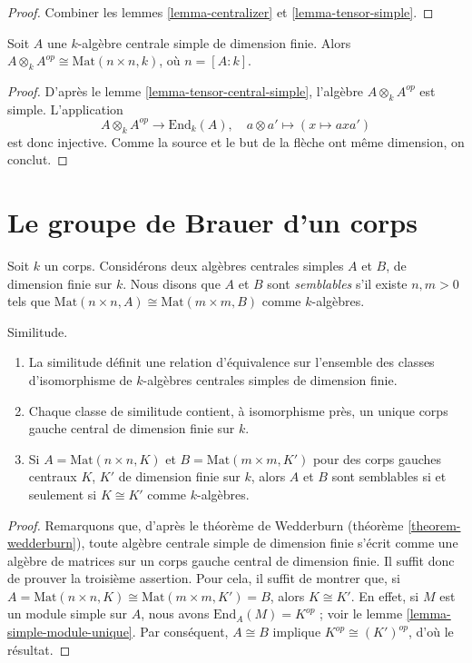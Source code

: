 \begin{proof}
Combiner les lemmes \ref{lemma-centralizer} et \ref{lemma-tensor-simple}.
\end{proof}

\begin{lemma}
\label{lemma-inverse}
Soit $A$ une $k$-algèbre centrale simple de dimension finie.
Alors $A \otimes_k A^{op} \cong \text{Mat}(n \times n, k)$,
où $n = [A : k]$.
\end{lemma}

\begin{proof}
D'après le lemme \ref{lemma-tensor-central-simple}, l'algèbre
$A \otimes_k A^{op}$ est simple. L'application
$$
A \otimes_k A^{op} \longrightarrow \text{End}_k(A),\quad
a \otimes a' \longmapsto (x \mapsto axa')
$$
est donc injective. Comme la source et le but de la flèche ont même dimension,
on conclut.
\end{proof}





\section{Le groupe de Brauer d'un corps}
\label{section-brauer}

\noindent
Soit $k$ un corps. Considérons deux algèbres centrales simples $A$ et $B$,
de dimension finie sur $k$. Nous disons que $A$ et $B$ sont {\it semblables}
s'il existe $n, m > 0$ tels que
$\text{Mat}(n \times n, A) \cong \text{Mat}(m \times m, B)$
comme $k$-algèbres.

\begin{lemma}
\label{lemma-similar}
Similitude.
\begin{enumerate}
\item La similitude définit une relation d'équivalence sur l'ensemble des
classes d'isomorphisme de $k$-algèbres centrales simples de dimension finie.
\item Chaque classe de similitude contient, à isomorphisme près, un unique
corps gauche central de dimension finie sur $k$.
\item Si $A = \text{Mat}(n \times n, K)$ et
$B = \text{Mat}(m \times m, K')$ pour des corps gauches centraux $K$, $K'$
de dimension finie sur $k$, alors $A$ et $B$ sont semblables si et seulement
si $K \cong K'$ comme $k$-algèbres.
\end{enumerate}
\end{lemma}

\begin{proof}
Remarquons que, d'après le théorème de Wedderburn
(théorème \ref{theorem-wedderburn}), toute algèbre centrale simple de
dimension finie s'écrit comme une algèbre de matrices sur un corps gauche
central de dimension finie. Il suffit donc de prouver la troisième assertion.
Pour cela, il suffit de montrer que, si
$A = \text{Mat}(n \times n, K) \cong \text{Mat}(m \times m, K') = B$,
alors $K \cong K'$. En effet, si $M$ est un module simple sur $A$, nous avons
$\text{End}_A(M) = K^{op}$ ; voir le
lemme \ref{lemma-simple-module-unique}.
Par conséquent, $A \cong B$ implique $K^{op} \cong (K')^{op}$, d'où le
résultat.
\end{proof}

